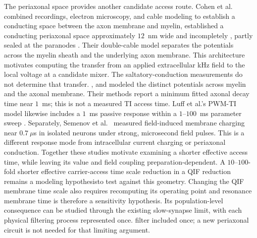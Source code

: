 \documentclass[11pt,a4paper]{article}
\providecommand{\DIFaddtex}[1]{{\protect\color{blue} \sf #1}} %
\providecommand{\DIFdeltex}[1]{{\protect\color{red} \scriptsize #1}} %
\providecommand{\DIFaddbegin}{} %
\providecommand{\DIFaddend}{} %
\providecommand{\DIFdelbegin}{} %
\providecommand{\DIFdelend}{} %
\providecommand{\DIFadd}[1]{\texorpdfstring{\DIFaddtex{#1}}{#1}} %
\providecommand{\DIFdel}[1]{\texorpdfstring{\DIFdeltex{#1}}{}} %
\begin{document}
\DIFdelbegin \DIFdel{The periaxonal space provides another candidate access route. }\DIFdelend Cohen et al.\ \cite{cohen2020periaxonal} \DIFdelbegin \DIFdel{combined recordings, electron microscopy, and cable modeling
to establish a conducting space between the axon membrane and myelin, }\DIFdelend \DIFaddbegin \DIFadd{established a conducting periaxonal space
}\DIFaddend approximately $12$~nm wide\DIFdelbegin \DIFdel{and incompletely }\DIFdelend \DIFaddbegin \DIFadd{, partly }\DIFaddend sealed at the paranodes\DIFdelbegin \DIFdel{. Their double-cable model separates
the potentials across the myelin sheath and the underlying axon membrane. This
architecture motivates computing the transfer from an applied extracellular kHz field
to the local voltage at a candidate mixer. The saltatory-conduction measurements do not
determine that transfer. }\DIFdelend \DIFaddbegin \DIFadd{, and modeled the distinct
potentials across myelin and the axonal membrane. Their methods report a minimum
fitted axonal decay time near $1$~ms; this is not a measured TI access time.
Luff et al.'s PWM-TI model likewise includes a $1$~ms passive response within a
$1$--$100$~ms parameter sweep \cite{luff2024}. Separately, Semenov et al.\
\cite{semenov2025} measured field-induced membrane charging near $0.7~\mu$s in
isolated neurons under strong, microsecond field pulses. This is a different
response mode from intracellular current charging or periaxonal conduction.
Together these studies motivate examining a shorter effective access time, while
leaving its value and field coupling preparation-dependent. }\DIFaddend A $10$--$100$-fold
\DIFdelbegin \DIFdel{shorter effective carrier-access time scale
}\DIFdelend \DIFaddbegin \DIFadd{reduction }\DIFaddend in a QIF \DIFdelbegin \DIFdel{reduction remains a modeling hypothesisto test against this geometry. Changing
the QIF membrane time scale also requires recomputing its operating point and resonance}\DIFdelend \DIFaddbegin \DIFadd{membrane time is therefore a sensitivity hypothesis. Its
population-level consequence can be studied through the existing slow-synapse
limit}\DIFaddend , with each physical \DIFdelbegin \DIFdel{filtering process represented once.
}\DIFdelend \DIFaddbegin \DIFadd{filter included once; a new periaxonal circuit is not
needed for that limiting argument.
}\DIFaddend
\end{document}

